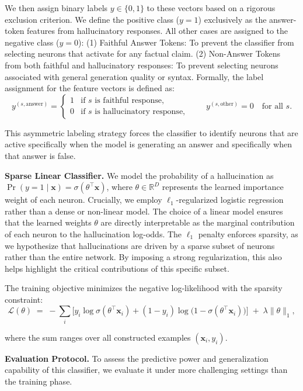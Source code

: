\documentclass[dvipsnames]{article}
\begin{document}
We then assign binary labels \(y \in \{0, 1\}\) to these vectors based on a rigorous exclusion criterion. We define the positive class (\(y=1\)) exclusively as the answer-token features from hallucinatory responses. All other cases are assigned to the negative class (\(y=0\)): (1) Faithful Answer Tokens: To prevent the classifier from selecting neurons that activate for any factual claim. (2) Non-Answer Tokens from both faithful and hallucinatory responses: To prevent selecting neurons associated with general generation quality or syntax.
Formally, the label assignment for the feature vectors is defined as:
\[
y^{(s,\text{answer})} = \begin{cases} 1 & \text{if $s$ is faithful response},\\ 0 & \text{if $s$ is hallucinatory response},\end{cases}
\qquad
y^{(s,\text{other})} = 0 \quad\text{for all } s.
\]


This asymmetric labeling strategy forces the classifier to identify neurons that are active specifically when the model is generating an answer and specifically when that answer is false.

\textbf{Sparse Linear Classifier.}\quad
We model the probability of a hallucination as $\Pr(y=1\mid \mathbf{x}) = \sigma(\theta^\top \mathbf{x})$, where $\theta \in \mathbb{R}^D$ represents the learned importance weight of each neuron.
Crucially, we employ $\ell_1$-regularized logistic regression rather than a dense or non-linear model. The choice of a linear model ensures that the learned weights $\theta$ are directly interpretable as the marginal contribution of each neuron to the hallucination log-odds. The $\ell_1$ penalty enforces sparsity, as we hypothesize that hallucinations are driven by a sparse subset of neurons rather than the entire network. By imposing a strong regularization, this also helps highlight the critical contributions of this specific subset. 

The training objective minimizes the negative log-likelihood with the sparsity constraint:
\begin{equation}
\label{eq: model}
\mathcal{L}(\theta) \;=\; -\sum_{i}\Big[ y_i\log \sigma(\theta^\top\mathbf{x}_i) + (1-y_i)\log\big(1-\sigma(\theta^\top\mathbf{x}_i)\big)\Big] \;+\; \lambda\|\theta\|_1,
\end{equation}

where the sum ranges over all constructed examples \((\mathbf{x}_i,y_i)\).

\textbf{Evaluation Protocol.}\quad
To assess the predictive power and generalization capability of this classifier, we evaluate it under more challenging settings than the training phase.
\end{document}
